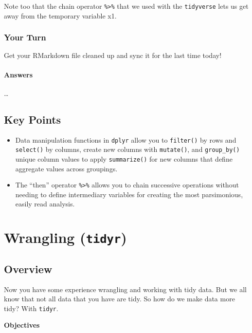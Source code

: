 \documentclass[]{book}
\providecommand{\tightlist}{%
  \setlength{\itemsep}{0pt}\setlength{\parskip}{0pt}}
\theoremstyle{definition}
\theoremstyle{definition}
\theoremstyle{definition}
\theoremstyle{remark}
\begin{document}
Note too that the chain operator \texttt{\%\textgreater{}\%} that we
used with the \texttt{tidyverse} lets us get away from the temporary
variable x1.

\subsection{Your Turn}\label{your-turn-8}

Get your RMarkdown file cleaned up and sync it for the last time today!

\subsubsection{Answers}\label{answers}

\ldots{}

\section{Key Points}\label{key-points}

\begin{itemize}
\tightlist
\item
  Data manipulation functions in \texttt{dplyr} allow you to
  \texttt{filter()} by rows and \texttt{select()} by columns, create new
  columns with \texttt{mutate()}, and \texttt{group\_by()} unique column
  values to apply \texttt{summarize()} for new columns that define
  aggregate values across groupings.
\item
  The ``then'' operator \texttt{\%\textgreater{}\%} allows you to chain
  successive operations without needing to define intermediary variables
  for creating the most parsimonious, easily read analysis.
\end{itemize}

\chapter{\texorpdfstring{Wrangling
(\texttt{tidyr})}{Wrangling (tidyr)}}\label{tidyr}

\section{Overview}\label{overview-1}

Now you have some experience wrangling and working with tidy data. But
we all know that not all data that you have are tidy. So how do we make
data more tidy? With \texttt{tidyr}.

\textbf{Objectives}
\end{document}

